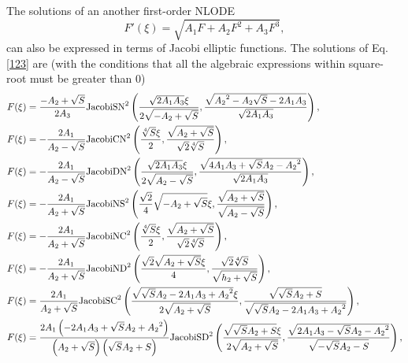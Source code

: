 \documentclass[prd,aps,floats,showkeys,nofootinbib,notitlepage]{revtex4-2}
\begin{document}
	The solutions of an another first-order NLODE \cite{fexpn123,Schwalm}
	\begin{equation}\label{123}
		F'(\xi)=\sqrt{A_1F+A_2F^2+A_3F^3}, 
	\end{equation}
	can also be expressed in terms of Jacobi elliptic functions. The solutions of Eq. \eqref{123} are (with the conditions that all the algebraic expressions within square-root must be greater than $0$)
	\begin{subequations}\label{123_solu}
		\begin{align}
			&F(\xi)=    \frac{{ - {A_2} + \sqrt S }}{{2{A_3}}}{\text{JacobiS}}{{\text{N}}^2}\left( { \frac{{\sqrt {2{A_1} {A_3}} \xi }}{{2\sqrt { - {A_2} + \sqrt S } }}, \frac{{\sqrt {{A_2}^2 - {A_2} \sqrt S  - 2 {A_1} {A_3}} }}{{\sqrt {2{A_1} {A_3}} }}} \right), \hfill \\
			&F(\xi)=    -  \frac{{2{A_1}}}{{{A_2} - \sqrt S }}{\text{JacobiC}}{{\text{N}}^2}\left( { \frac{{\sqrt[4]{S}\xi }}{2}, \frac{{\sqrt {{A_2} + \sqrt S } }}{{\sqrt 2 \sqrt[4]{S}}}} \right), \hfill \\
			&F(\xi)=    - \frac{{2{A_1}}}{{{A_2} - \sqrt S }}{\text{JacobiD}}{{\text{N}}^2}\left( {\frac{{\sqrt {2{A_1} {A_3}} \xi }}{{2\sqrt {{A_2} - \sqrt S } }}, \frac{{\sqrt {4 {A_1} {A_3} + \sqrt S {A_2} - {A_2}^2} }}{{\sqrt {2{A_1} {A_3}} }}} \right), \hfill \\
			&F(\xi)=    - \frac{{2{A_1}}}{{{A_2} + \sqrt S }}{\text{JacobiN}}{{\text{S}}^2}\left( { \frac{{\sqrt 2 }}{4}\sqrt { - {A_2} + \sqrt S } \xi ,\frac{{\sqrt {{A_2} + \sqrt S } }}{{\sqrt {{A_2} - \sqrt S } }}} \right), \hfill \\
			&F(\xi)=    - \frac{{2{A_1}}}{{{A_2} + \sqrt S }}{\text{JacobiN}}{{\text{C}}^2}\left( { \frac{{\sqrt[4]{S}\xi }}{2},\frac{{\sqrt {{A_2} + \sqrt S } }}{{\sqrt 2 \sqrt[4]{S}}}} \right), \hfill \\
			&F(\xi)=    - \frac{{2{A_1}}}{{{A_2} + \sqrt S }}{\text{JacobiN}}{{\text{D}}^2}\left( { \frac{{\sqrt 2 \sqrt {{A_2} + \sqrt S } \xi }}{4},\frac{{\sqrt 2 \sqrt[4]{S}}}{{\sqrt {{h_2} + \sqrt S } }}} \right), \hfill \\
			&F(\xi)=   \frac{{2{A_1}}}{{{A_2} + \sqrt S }}{\text{JacobiS}}{{\text{C}}^2}\left( {\frac{{\sqrt {\sqrt S {A_2} - 2 {A_1} {A_3} + {A_2}^2} \xi }}{{2\sqrt {{A_2} + \sqrt S } }},\frac{{\sqrt {\sqrt S {A_2} + S} }}{{\sqrt {\sqrt S {A_2} - 2 {A_1} {A_3} + {A_2}^2} }}} \right), \hfill \\
			&F(\xi)=   \frac{{2{A_1} \left( { - 2 {A_1} {A_3} + \sqrt S {A_2} + {A_2}^2} \right)}}{{\left( {{A_2} + \sqrt S } \right)\left( {\sqrt S {A_2} + S} \right)}}{\text{JacobiS}}{{\text{D}}^2}\left( {\frac{{\sqrt {\sqrt S {A_2} + S} \xi }}{{2\sqrt {{A_2} + \sqrt S } }},\frac{{\sqrt {2 {A_1} {A_3} - \sqrt S {A_2} - {A_2}^2} }}{{\sqrt { - \sqrt S {A_2} - S} }}} \right), \hfill \\

\end{align}
\end{subequations}
\end{document}

